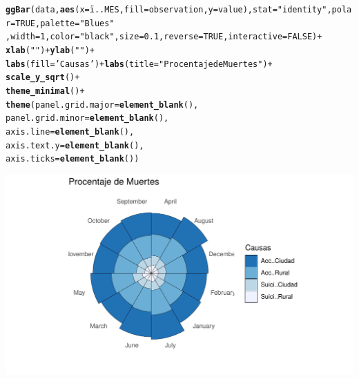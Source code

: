 \documentclass{article}\usepackage[]{graphicx}\usepackage[]{color}
\makeatletter
\def\maxwidth{ %
  \ifdim\Gin@nat@width>\linewidth
    \linewidth
  \else
    \Gin@nat@width
  \fi
}
\newcommand{\hlnum}[1]{\textcolor[rgb]{0.686,0.059,0.569}{#1}}%
\newcommand{\hlstr}[1]{\textcolor[rgb]{0.192,0.494,0.8}{#1}}%
\newcommand{\hlopt}[1]{\textcolor[rgb]{0,0,0}{#1}}%
\newcommand{\hlstd}[1]{\textcolor[rgb]{0.345,0.345,0.345}{#1}}%
\newcommand{\hlkwc}[1]{\textcolor[rgb]{0.333,0.667,0.333}{#1}}%
\newcommand{\hlkwd}[1]{\textcolor[rgb]{0.737,0.353,0.396}{\textbf{#1}}}%
\newenvironment{kframe}{%
 \def\at@end@of@kframe{}%
 \ifinner\ifhmode%
  \def\at@end@of@kframe{\end{minipage}}%
  \begin{minipage}{\columnwidth}%
 \fi\fi%
 \def\FrameCommand##1{\hskip\@totalleftmargin \hskip-\fboxsep
 \colorbox{shadecolor}{##1}\hskip-\fboxsep
     \hskip-\linewidth \hskip-\@totalleftmargin \hskip\columnwidth}%
 \MakeFramed {\advance\hsize-\width
   \@totalleftmargin\z@ \linewidth\hsize
   \@setminipage}}%
 {\par\unskip\endMakeFramed%
 \at@end@of@kframe}
\newenvironment{knitrout}{}{} %
\makeatother
\begin{document}
\begin{knitrout}
\color{fgcolor}\begin{kframe}
\begin{alltt}
\hlkwd{ggBar}\hlstd{(data,} \hlkwd{aes}\hlstd{(}\hlkwc{x}\hlstd{=ï..MES,}\hlkwc{fill}\hlstd{=observation,}\hlkwc{y}\hlstd{=value),}\hlkwc{stat}\hlstd{=}\hlstr{"identity"}\hlstd{,}\hlkwc{polar}\hlstd{=}\hlnum{TRUE}\hlstd{,}\hlkwc{palette}\hlstd{=}\hlstr{"Blues"}
      \hlstd{,}\hlkwc{width}\hlstd{=}\hlnum{1}\hlstd{,} \hlkwc{color}\hlstd{=}\hlstr{"black"}\hlstd{,}\hlkwc{size}\hlstd{=}\hlnum{0.1}\hlstd{,}\hlkwc{reverse}\hlstd{=}\hlnum{TRUE}\hlstd{,}\hlkwc{interactive}\hlstd{=}\hlnum{FALSE}\hlstd{)}\hlopt{+}
    \hlkwd{xlab}\hlstd{(}\hlstr{""}\hlstd{)} \hlopt{+}  \hlkwd{ylab}\hlstd{(}\hlstr{""}\hlstd{)} \hlopt{+}
  \hlkwd{labs}\hlstd{(}\hlkwc{fill}\hlstd{=}\hlstr{'Causas'}\hlstd{)} \hlopt{+} \hlkwd{labs}\hlstd{(}\hlkwc{title} \hlstd{=} \hlstr{"Procentaje de Muertes"}\hlstd{)} \hlopt{+}
    \hlkwd{scale_y_sqrt}\hlstd{()} \hlopt{+}
    \hlkwd{theme_minimal}\hlstd{()} \hlopt{+}
    \hlkwd{theme}\hlstd{(}\hlkwc{panel.grid.major} \hlstd{=} \hlkwd{element_blank}\hlstd{(),}
          \hlkwc{panel.grid.minor} \hlstd{=} \hlkwd{element_blank}\hlstd{(),}
          \hlkwc{axis.line} \hlstd{=} \hlkwd{element_blank}\hlstd{(),}
          \hlkwc{axis.text.y} \hlstd{=} \hlkwd{element_blank}\hlstd{(),}
          \hlkwc{axis.ticks} \hlstd{=} \hlkwd{element_blank}\hlstd{())}
\end{alltt}
\end{kframe}

{\centering \includegraphics[width=\maxwidth]{figure/plot_bar_rose-1} 

}



\end{knitrout}
\end{document}
